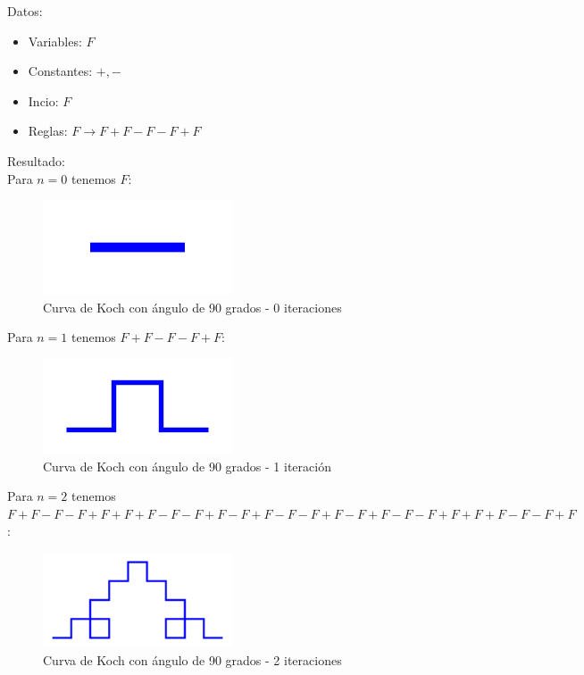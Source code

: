 \noindent Datos:

\begin{itemize}
    \item Variables: $F$
    \item Constantes: $+,-$
    \item Incio: $F$
    \item Reglas: $F \rightarrow F+F-F-F+F$
\end{itemize}

\noindent Resultado:\\

\noindent Para $n=0$ tenemos $F$:

\begin{figure}[H]
    
    \centering
    \includegraphics[width=0.5\textwidth]{figures/l-system-kock-snowflake-1.png}
    \caption{Curva de Koch con ángulo de 90 grados - 0 iteraciones}
    \label{fig:koch-snowflake-1}
\end{figure}

\noindent Para $n=1$ tenemos $F+F-F-F+F$:

\begin{figure}[H]
    \centering
    \includegraphics[width=0.5\textwidth]{figures/l-system-kock-snowflake-2.png}
    \caption{Curva de Koch con ángulo de 90 grados - 1 iteración}
    \label{fig:koch-snowflake-2}
\end{figure}

\noindent Para $n=2$ tenemos $F+F-F-F+F+F+F-F-F+F-F+F-F-F+F-F+F-F-F+F+F+F-F-F+F$:

\begin{figure}[H]
    \centering
    \includegraphics[width=0.5\textwidth]{figures/l-system-kock-snowflake-3.png}
    \caption{Curva de Koch con ángulo de 90 grados - 2 iteraciones}
    \label{fig:koch-snowflake-3}
\end{figure}

